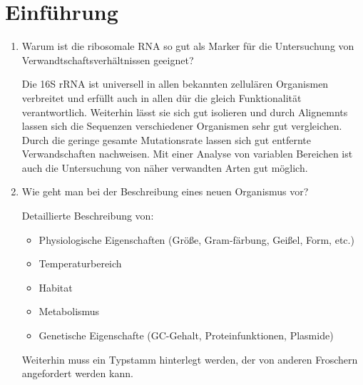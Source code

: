 
\section{Einführung}
\begin{enumerate}
\item Warum ist die ribosomale RNA so gut als Marker für die Untersuchung von Verwandtschaftsverhältnissen geeignet?
	
	Die 16S rRNA ist universell in allen bekannten zellulären Organismen verbreitet
	und erfüllt auch in allen dür die gleich Funktionalität verantwortlich.
	Weiterhin lässt sie sich gut isolieren
	und durch Alignemnts lassen sich die Sequenzen verschiedener Organismen sehr gut vergleichen.
	Durch die geringe gesamte Mutationsrate lassen sich gut entfernte Verwandschaften nachweisen.
	Mit einer Analyse von variablen Bereichen ist auch die Untersuchung von näher verwandten Arten gut möglich.

\item Wie geht man bei der Beschreibung eines neuen Organismus vor?
	
	Detaillierte Beschreibung von:
	\begin{itemize}
		\item Physiologische Eigenschaften (Größe, Gram-färbung, Geißel, Form, etc.)
		\item Temperaturbereich
		\item Habitat
		\item Metabolismus
		\item Genetische Eigenschafte (GC-Gehalt, Proteinfunktionen, Plasmide)
	\end{itemize}

	Weiterhin muss ein Typstamm hinterlegt werden,
	der von anderen Froschern angefordert werden kann.

\end{enumerate}

